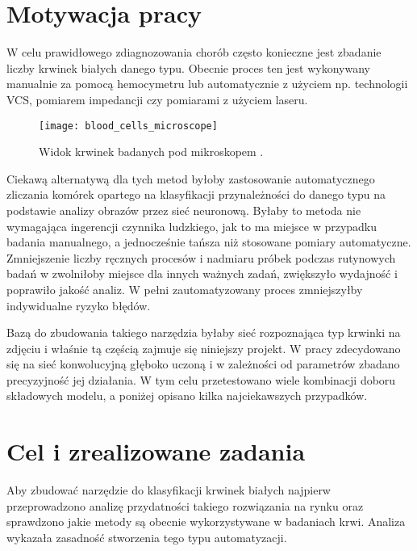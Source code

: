 \section{Motywacja pracy}
\label{sec:motywacja_pracy}

W celu prawidłowego zdiagnozowania chorób często konieczne jest zbadanie liczby krwinek białych danego typu. Obecnie proces ten jest wykonywany manualnie za pomocą hemocymetru lub automatycznie z użyciem np. technologii VCS, pomiarem impedancji czy pomiarami z użyciem laseru. 

\begin{figure}[h]
	\centering
		\texttt{[image: blood\_cells\_microscope]}
	\caption{Widok krwinek badanych pod mikroskopem \cite{cells_microscope}.}
\end{figure}

Ciekawą alternatywą dla tych metod byłoby zastosowanie automatycznego zliczania komórek opartego na klasyfikacji przynależności do danego typu na podstawie analizy obrazów przez sieć neuronową. Byłaby to metoda nie wymagająca ingerencji czynnika ludzkiego, jak to ma miejsce w przypadku badania manualnego, a jednocześnie tańsza niż stosowane pomiary automatyczne. Zmniejszenie liczby ręcznych procesów i nadmiaru próbek podczas rutynowych badań w zwolniłoby miejsce dla innych ważnych zadań, zwiększyło wydajność i poprawiło jakość analiz. W pełni zautomatyzowany proces zmniejszyłby indywidualne ryzyko błędów.

Bazą do zbudowania takiego narzędzia byłaby sieć rozpoznająca typ krwinki na zdjęciu i właśnie tą częścią zajmuje się niniejszy projekt. W pracy zdecydowano się na sieć konwolucyjną głęboko uczoną i w zależności od parametrów zbadano precyzyjność jej działania. W tym celu przetestowano wiele kombinacji doboru składowych modelu, a poniżej opisano kilka najciekawszych przypadków.

\section{Cel i zrealizowane zadania}
\label{sec:cel_i_zrealizowane_zadania}

Aby zbudować narzędzie do klasyfikacji krwinek białych najpierw przeprowadzono analizę przydatności takiego rozwiązania na rynku oraz sprawdzono jakie metody są obecnie wykorzystywane w badaniach krwi. Analiza wykazała zasadność stworzenia tego typu automatyzacji.

